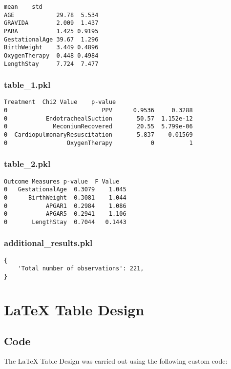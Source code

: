 \documentclass[11pt]{article}
\begin{document}
\begin{Verbatim}[tabsize=4]
                mean    std
AGE            29.78  5.534
GRAVIDA        2.009  1.437
PARA           1.425 0.9195
GestationalAge 39.67  1.296
BirthWeight    3.449 0.4896
OxygenTherapy  0.448 0.4984
LengthStay     7.724  7.477
\end{Verbatim}

\subsubsection*{table\_1.pkl}

\begin{Verbatim}[tabsize=4]
                      Treatment  Chi2 Value    p-value
0                           PPV      0.9536     0.3288
0           EndotrachealSuction       50.57  1.152e-12
0             MeconiumRecovered       20.55  5.799e-06
0  CardiopulmonaryResuscitation       5.837    0.01569
0                 OxygenTherapy           0          1
\end{Verbatim}

\subsubsection*{table\_2.pkl}

\begin{Verbatim}[tabsize=4]
  Outcome Measures p-value  F Value
0   GestationalAge  0.3079    1.045
0      BirthWeight  0.3081    1.044
0           APGAR1  0.2984    1.086
0           APGAR5  0.2941    1.106
0       LengthStay  0.7044   0.1443
\end{Verbatim}

\subsubsection*{additional\_results.pkl}

\begin{Verbatim}[tabsize=4]
{
    'Total number of observations': 221,
}
\end{Verbatim}

\section{LaTeX Table Design} \subsection{Code}The LaTeX Table Design was carried out using the following custom code:
\end{document}
